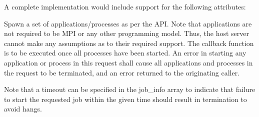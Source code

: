 
\optattr
A complete implementation would include support for the following attributes:


\descr

Spawn a set of applications/processes as per the  API.
Note that applications are not required to be MPI or any other programming model.
Thus, the host server cannot make any assumptions as to their required support.
The callback function is to be executed once all processes have been started.
An error in starting any application or process in this request shall cause all applications and processes in the request to be terminated, and an error returned to the originating caller.

Note that a timeout can be specified in the job_info array to indicate that failure to start the requested job within the given time should result in termination to avoid hangs.


\subsection{}

